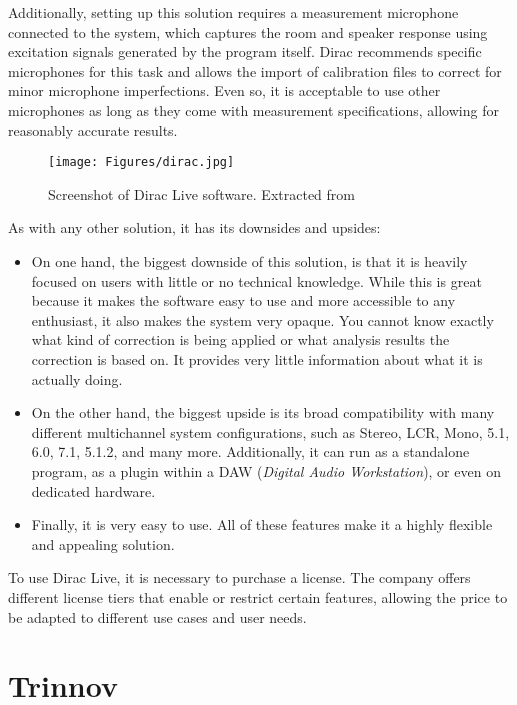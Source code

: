 Additionally, setting up this solution requires a measurement microphone connected to the system, which captures the room and speaker response using excitation signals generated by the program itself. Dirac recommends specific microphones for this task and allows the import of calibration files to correct for minor microphone imperfections. Even so, it is acceptable to use other microphones as long as they come with measurement specifications, allowing for reasonably accurate results.

\begin{figure}[H]
	\centering
	\texttt{[image: Figures/dirac.jpg]}
	\caption[Screenshot of Dirac Live]{Screenshot of Dirac Live software. Extracted from \cite{dirac_image}}
	\label{fig:Dirac}
\end{figure}

As with any other solution, it has its downsides and upsides:

\begin{itemize}
	\item On one hand, the biggest downside of this solution, is that it is heavily focused on users with little or no technical knowledge. While this is great because it makes the software easy to use and more accessible to any enthusiast, it also makes the system very opaque. You cannot know exactly what kind of correction is being applied or what analysis results the correction is based on. It provides very little information about what it is actually doing.
	
	\item On the other hand, the biggest upside is its broad compatibility with many different multichannel system configurations, such as Stereo, LCR, Mono, 5.1, 6.0, 7.1, 5.1.2, and many more. Additionally, it can run as a standalone program, as a plugin within a DAW (\textit{Digital Audio Workstation}), or even on dedicated hardware.
	
	\item Finally, it is very easy to use. All of these features make it a highly flexible and appealing solution.
\end{itemize}

To use Dirac Live, it is necessary to purchase a license. The company offers different license tiers that enable or restrict certain features, allowing the price to be adapted to different use cases and user needs.


\section{Trinnov}

